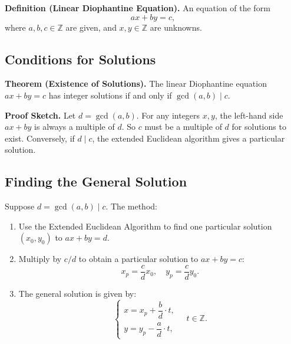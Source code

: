 \documentclass[11pt,a4paper]{article}
\begin{document}
\textbf{Definition (Linear Diophantine Equation).} An equation of the form
\begin{equation*}
    ax + by = c,
\end{equation*}
where $a, b, c \in \mathbb{Z}$ are given, and $x, y \in \mathbb{Z}$ are unknowns.

\subsection{Conditions for Solutions}

\textbf{Theorem (Existence of Solutions).} The linear Diophantine equation $ax + by = c$ has integer solutions if and only if $\gcd(a, b) \mid c$.

\textbf{Proof Sketch.} Let $d = \gcd(a, b)$. For any integers $x, y$, the left-hand side $ax + by$ is always a multiple of $d$. So $c$ must be a multiple of $d$ for solutions to exist. Conversely, if $d \mid c$, the extended Euclidean algorithm gives a particular solution.

\subsection{Finding the General Solution}

Suppose $d = \gcd(a, b) \mid c$. The method:
\begin{enumerate}[label=\textbf{Step \arabic*:}]
    \item Use the Extended Euclidean Algorithm to find one particular solution $(x_0, y_0)$ to $a x + b y = d$.
    \item Multiply by $c/d$ to obtain a particular solution to $a x + b y = c$:
    \begin{equation*}
        x_p = \frac{c}{d} x_0, \quad y_p = \frac{c}{d} y_0.
    \end{equation*}
    \item The general solution is given by:
    \begin{equation*}
        \begin{cases}
            x = x_p + \dfrac{b}{d} \cdot t, \\[12pt]
            y = y_p - \dfrac{a}{d} \cdot t,
        \end{cases}
        \quad t \in \mathbb{Z}.
    \end{equation*}
\end{enumerate}
\end{document}

